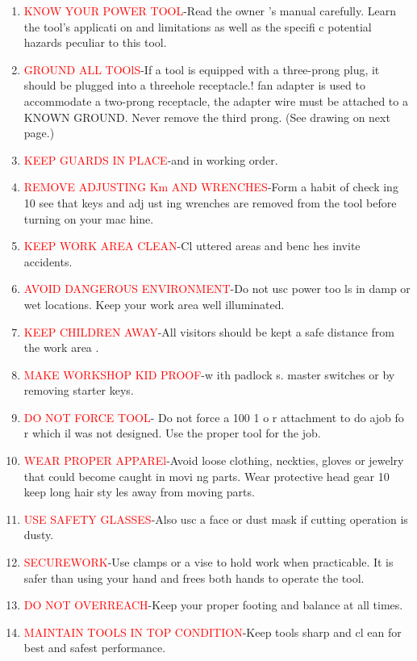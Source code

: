 \begin{enumerate}
\item\textcolor{Red}{KNOW YOUR POWER TOOL}-Read the owner 's
manual carefully. Learn the tool's applicati on and
limitations as well as the specifi c potential hazards
peculiar to this tool.
\item\textcolor{Red}{GROUND ALL TOOlS}-If a tool is equipped with a
three-prong plug, it should be plugged into a threehole receptacle.! fan adapter is used to accommodate
a two-prong receptacle, the adapter wire must be
attached to a KNOWN GROUND. Never remove
the third prong. (See drawing on next page.)
\item\textcolor{Red}{KEEP GUARDS IN PLACE}-and in working order.
\item\textcolor{Red}{REMOVE ADJUSTING Km AND WRENCHES}-Form a
habit of check ing 10 see that keys and adj ust ing
wrenches are removed from the tool before turning
on your mac hine.
\item\textcolor{Red}{KEEP WORK AREA CLEAN}-Cl uttered areas and
benc hes invite accidents.
\item\textcolor{Red}{AVOID DANGEROUS ENVIRONMENT}-Do not usc
power too ls in damp or wet locations. Keep your
work area well illuminated.
\item\textcolor{Red}{KEEP CHILDREN AWAY}-All visitors should be kept
a safe distance from the work area .
\item\textcolor{Red}{MAKE WORKSHOP KID PROOF}-w ith padlock s.
master switches or by removing starter keys.
\item\textcolor{Red}{DO NOT FORCE TOOL}- Do not force a 100 1 o r
attachment to do ajob fo r which il was not designed.
Use the proper tool for the job.
\item\textcolor{Red}{WEAR PROPER APPAREl}-Avoid loose clothing,
neckties, gloves or jewelry that could become caught
in movi ng parts. Wear protective head gear 10 keep
long hair sty les away from moving parts.
\item\textcolor{Red}{USE SAFETY GLASSES}-Also usc a face or dust mask
if cutting operation is dusty.
\item\textcolor{Red}{SECUREWORK}-Use clamps or a vise to hold work
when practicable. It is safer than using your hand
and frees both hands to operate the tool.
\item\textcolor{Red}{DO NOT OVERREACH}-Keep your proper footing
and balance at all times.
\item\textcolor{Red}{MAINTAIN TOOLS IN TOP CONDITION}-Keep tools
sharp and cl ean for best and safest performance.

\end{enumerate}
